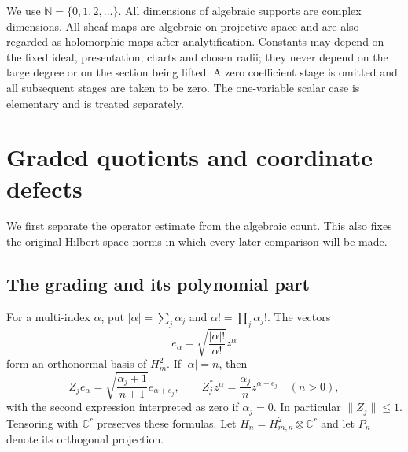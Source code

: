 \documentclass[11pt,reqno]{amsart}
\numberwithin{equation}{section}
\theoremstyle{definition}
\theoremstyle{remark}
\newcommand{\C}{\mathbb C}
\newcommand{\N}{\mathbb N}
\begin{document}
We use $\N=\{0,1,2,\ldots\}$.  All dimensions of algebraic supports are complex dimensions.  All sheaf
maps are algebraic on projective space and are also regarded as holomorphic
maps after analytification.  Constants may depend on the fixed ideal,
presentation, charts and chosen radii; they never depend on the large
degree or on the section being lifted.  A zero coefficient stage is omitted
and all subsequent stages are taken to be zero.  The one-variable scalar
case is elementary and is treated separately.



\section{Graded quotients and coordinate defects}
\label{sec:operators}

We first separate the operator estimate from the algebraic count.  This
also fixes the original Hilbert-space norms in which every later
comparison will be made.

\subsection{The grading and its polynomial part}
For a multi-index $\alpha$, put $|\alpha|=\sum_j\alpha_j$ and
$\alpha!=\prod_j\alpha_j!$.  The vectors
\[
 e_\alpha=\sqrt{\frac{|\alpha|!}{\alpha!}}z^\alpha
\]
form an orthonormal basis of $H_m^2$.  If $|\alpha|=n$, then
\begin{equation}\label{eq:op-shift}
 Z_je_\alpha=\sqrt{\frac{\alpha_j+1}{n+1}}e_{\alpha+e_j},
 \qquad
 Z_j^*z^\alpha=\frac{\alpha_j}{n}z^{\alpha-e_j}\quad(n>0),
\end{equation}
with the second expression interpreted as zero if $\alpha_j=0$.
In particular $\|Z_j\|\le1$.  Tensoring with $\C^r$ preserves these
formulas.  Let $H_n=H_{m,n}^2\otimes\C^r$ and let $P_n$ denote its
orthogonal projection.
\end{document}
